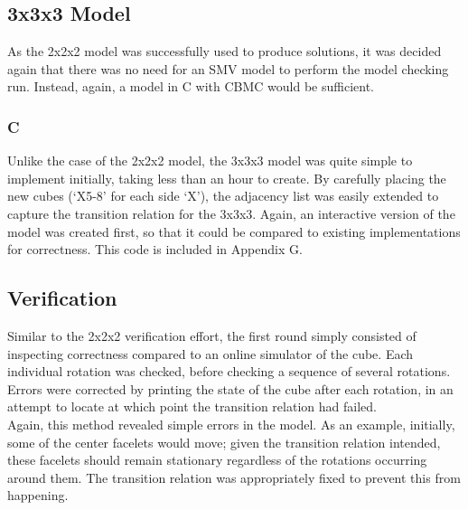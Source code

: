 \documentclass{article}
\begin{document}
\subsection {3x3x3 Model}

As the 2x2x2 model was successfully used to produce solutions, it was decided again that there was no need for an SMV model to perform the model checking run. Instead, again, a model in C with CBMC would be sufficient.

\subsubsection {C}

Unlike the case of the 2x2x2 model, the 3x3x3 model was quite simple to implement initially, taking less than an hour to create. By carefully placing the new cubes (`X5-8' for each side `X'), the adjacency list was easily extended to capture the transition relation for the 3x3x3. Again, an interactive version of the model was created first, so that it could be compared to existing implementations for correctness. This code is included in Appendix G.

\subsection {Verification}

Similar to the 2x2x2 verification effort, the first round simply consisted of inspecting correctness compared to an online simulator of the cube. Each individual rotation was checked, before checking a sequence of several rotations. Errors were corrected by printing the state of the cube after each rotation, in an attempt to locate at which point the transition relation had failed.\\

\noindent Again, this method revealed simple errors in the model. As an example, initially, some of the center facelets would move; given the transition relation intended, these facelets should remain stationary regardless of the rotations occurring around them. The transition relation was appropriately fixed to prevent this from happening. \\
\end{document}
